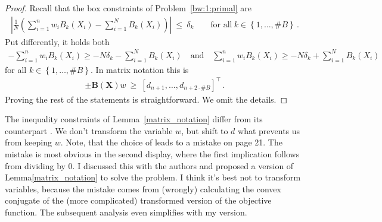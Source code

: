 \begin{proof}
  Recall that the box constraints of Problem~\ref{bw:1:primal} are
  \begin{gather*}
        \left| 
      \frac{1}{N} 
      \left( 
      \sum_{i = 1}^{n} 
      w_i
      B_k(X_i)
      -
      \sum_{i=1}^{N} 
      B_k(X_i)
      \right)
    \right|
    \ 
    \le 
    \ 
    \delta_k
    \qquad
    \text{for all}\ 
    k\in \left\{ 1,\ldots,\# B \right\}
    \,.
  \end{gather*}
  Put differently, it holds both
  \begin{align*}
    -
      \sum_{i = 1}^{n} 
      w_i
      B_k(X_i)
    \ge 
    -
    N
    \delta_k
      -
      \sum_{i=1}^{N} 
      B_k(X_i)
      \quad 
    \text{and}
      \quad
      \sum_{i = 1}^{n} 
      w_i
      B_k(X_i)
    \ge 
    -
    N
    \delta_k
      +
      \sum_{i=1}^{N} 
      B_k(X_i)
  \end{align*}
  for all 
  $
    k\in \left\{ 1,\ldots,\# B \right\}
  $. In matrix notation this is 
  \begin{gather*}
    \pm\mathbf{B}(\mathbf{X})w
    \ 
    \ge
    \ 
    [d_{n+1},\ldots, d_{n+2\cdot\# B}]^\top
    \,.
  \end{gather*}
  Proving the rest of the statements is straightforward. We omit the details.
\end{proof}
\begin{remark}
  The inequality constraints of
  Lemma~\ref{matrix_notation} differ from its counterpart
  \cite[Proof of Lemma~1]{Wang2019}.
  We don't transform the variable $w$, but shift to $d$ what prevents us from keeping $w$.
  Note, that the choice of
  \cite[Proof of Lemma~1]{Wang2019} leads to a mistake on page 21.
  The mistake is most obvious in the second display, where the first implication follows from dividing by 0. I discussed this with the authors and proposed a version of Lemma\ref{matrix_notation} to solve the problem. I think it's best not to transform variables, because the mistake comes from (wrongly) calculating the convex conjugate of the (more complicated) transformed version of the objective function. The subsequent analysis even simplifies with my version.
\end{remark}

